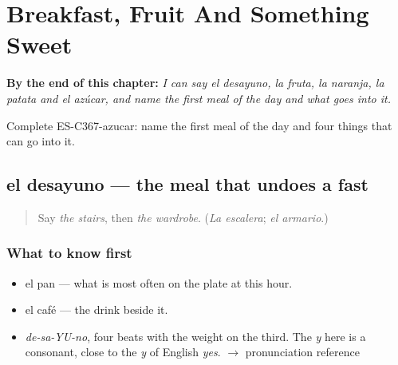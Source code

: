 
\chapter{Breakfast, Fruit And Something Sweet}
\label{ch:el-desayuno-y-la-fruta}

\begin{chapteropening}
\textbf{By the end of this chapter:} \emph{I can say el desayuno, la fruta, la naranja, la patata and el azúcar, and name the first meal of the day and what goes into it.}

Complete ES-C367-azucar: name the first meal of the day and four things that can go into it.
\end{chapteropening}

\section[el desayuno]{el desayuno — the meal that undoes a fast}

\label{lesson:ES-C367-desayuno}



\begin{quote}
Say \emph{the stairs}, then \emph{the wardrobe}. (\emph{La escalera}; \emph{el armario}.)
\end{quote}

\subsection*{What to know first}
\begin{itemize}
\raggedright
  \item el pan — what is most often on the plate at this hour.
  \item el café — the drink beside it.
\end{itemize}

\begin{sounds}
\begin{itemize}
\raggedright
  \item \emph{de-sa-YU-no}, four beats with the weight on the third. The \emph{y} here is a consonant, close to the \emph{y} of English \emph{yes}. $\to$ pronunciation reference
\end{itemize}
\end{sounds}

